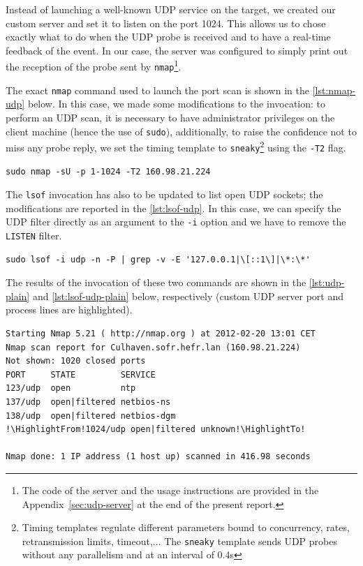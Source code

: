 \documentclass[10pt,a4paper,twoside,onecolumn]{article}
\begin{document}
Instead of launching a well-known UDP service on the target, we created our custom server and set it to listen on the port 1024. This allows us to chose exactly what to do when the UDP probe is received and to have a real-time feedback of the event. In our case, the server was configured to simply print out the reception of the probe sent by \texttt{nmap}\footnote{The code of the server and the usage instructions are provided in the Appendix~\ref{sec:udp-server} at the end of the present report.}.

The exact \texttt{nmap} command used to launch the port scan is shown in the \autoref{lst:nmap-udp} below. In this case, we made some modifications to the invocation: to perform an UDP scan, it is necessary to have administrator privileges on the client machine (hence the use of \texttt{sudo}), additionally, to raise the confidence not to miss any probe reply, we set the timing template to \texttt{sneaky}\footnote{Timing templates regulate different parameters bound to concurrency, rates, retransmission limits, timeout,... The \texttt{sneaky} template sends UDP probes without any parallelism and at an interval of 0.4s} using the \texttt{-T2} flag.
\begin{lstlisting}
sudo nmap -sU -p 1-1024 -T2 160.98.21.224
\end{lstlisting}

The \texttt{lsof} invocation has also to be updated to list open UDP sockets; the modifications are reported in the \autoref{lst:lsof-udp}. In this case, we can specify the UDP filter directly as an argument to the \texttt{-i} option and we have to remove the \texttt{LISTEN} filter.

\begin{lstlisting}
sudo lsof -i udp -n -P | grep -v -E '127.0.0.1|\[::1\]|\*:\*'
\end{lstlisting}

The results of the invocation of these two commands are shown in the \autoref{lst:udp-plain} and \autoref{lst:lsof-udp-plain} below, respectively (custom UDP server port and process lines are highlighted).

\begin{lstlisting}
Starting Nmap 5.21 ( http://nmap.org ) at 2012-02-20 13:01 CET
Nmap scan report for Culhaven.sofr.hefr.lan (160.98.21.224)
Not shown: 1020 closed ports
PORT     STATE         SERVICE
123/udp  open          ntp
137/udp  open|filtered netbios-ns
138/udp  open|filtered netbios-dgm
!\HighlightFrom!1024/udp open|filtered unknown!\HighlightTo!

Nmap done: 1 IP address (1 host up) scanned in 416.98 seconds
\end{lstlisting}
\end{document}
